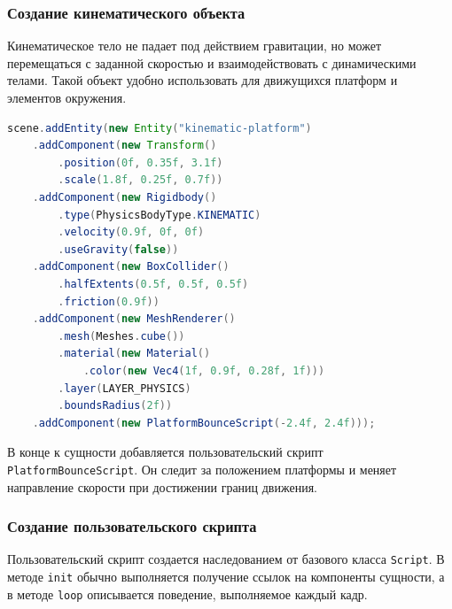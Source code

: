 \subsubsection{Создание кинематического объекта}

Кинематическое тело не падает под действием гравитации, но может перемещаться с заданной скоростью и взаимодействовать с динамическими телами. Такой объект удобно использовать для движущихся платформ и элементов окружения.

\begin{lstlisting}[language=Java,caption={Создание кинематической платформы}]
scene.addEntity(new Entity("kinematic-platform")
    .addComponent(new Transform()
        .position(0f, 0.35f, 3.1f)
        .scale(1.8f, 0.25f, 0.7f))
    .addComponent(new Rigidbody()
        .type(PhysicsBodyType.KINEMATIC)
        .velocity(0.9f, 0f, 0f)
        .useGravity(false))
    .addComponent(new BoxCollider()
        .halfExtents(0.5f, 0.5f, 0.5f)
        .friction(0.9f))
    .addComponent(new MeshRenderer()
        .mesh(Meshes.cube())
        .material(new Material()
            .color(new Vec4(1f, 0.9f, 0.28f, 1f)))
        .layer(LAYER_PHYSICS)
        .boundsRadius(2f))
    .addComponent(new PlatformBounceScript(-2.4f, 2.4f)));
\end{lstlisting}

В конце к сущности добавляется пользовательский скрипт \texttt{PlatformBounceScript}. Он следит за положением платформы и меняет направление скорости при достижении границ движения.

\subsubsection{Создание пользовательского скрипта}

Пользовательский скрипт создается наследованием от базового класса \texttt{Script}. В методе \texttt{init} обычно выполняется получение ссылок на компоненты сущности, а в методе \texttt{loop} описывается поведение, выполняемое каждый кадр.

